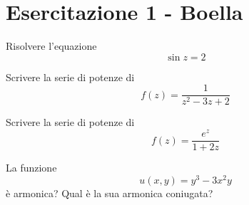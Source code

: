 

%
%
%
%
%
%
%
%
%
%









\chapter{Esercitazione 1 - Boella}

\ParteEsercizi

\Esercizio{}

Risolvere l'equazione
\begin{equation*}
\sin z = 2
\end{equation*}

\Esercizio{}

Scrivere la serie di potenze di
\begin{equation*}
f(z) = \frac{1}{z^{2} - 3z + 2}
\end{equation*}

\Esercizio{}

Scrivere la serie di potenze di
\begin{equation*}
f(z) = \frac{e^{z}}{1 + 2z}
\end{equation*}

\Esercizio{}

La funzione
\begin{equation*}
u(x, y) = y^{3} - 3x^{2} y
\end{equation*}
è armonica? Qual è la sua armonica coniugata?

